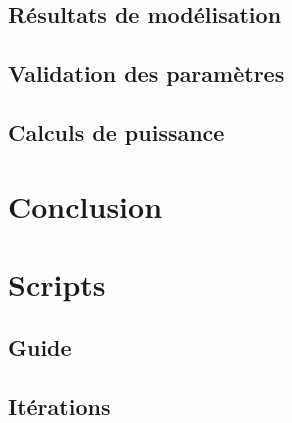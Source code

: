 \documentclass[a4paper,11pt]{report}
\begin{document}
\section{Résultats de modélisation}
\section{Validation des paramètres}
\section{Calculs de puissance}
\chapter*{Conclusion}

\appendix
\chapter{Scripts}
\section{Guide}
\section{Itérations}
\nocite{*}


\end{document}
